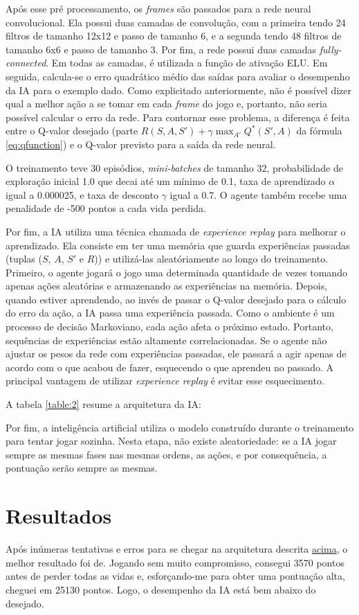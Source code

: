 Após esse pré processamento, os \textit{frames} são passados para a rede neural convolucional. Ela possui duas camadas de convolução, com a primeira tendo 24 filtros de tamanho 12x12 e passo de tamanho 6, e a segunda tendo 48 filtros de tamanho 6x6 e passo de tamanho 3.
Por fim, a rede possui duas camadas \textit{fully-connected}.
Em todas as camadas, é utilizada a função de ativação ELU.
Em seguida, calcula-se o erro quadrático médio das saídas para avaliar o desempenho da IA para o exemplo dado.
Como explicitado anteriormente, não é possível dizer qual a melhor ação a se tomar em cada \textit{frame} do jogo e, portanto, não seria possível calcular o erro da rede.
Para contornar esse problema, a diferença é feita entre o Q-valor desejado (parte $R(S,A,S') + \gamma\max_{A'}Q^{*}(S',A)$ da fórmula \ref{eq:qfunction}) e o Q-valor previsto para a saída da rede neural.

O treinamento teve 30 episódios, \textit{mini-batches} de tamanho 32, probabilidade de exploração inicial 1.0 que decai até um mínimo de 0.1, taxa de aprendizado $\alpha$ igual a 0.000025, e taxa de desconto $\gamma$ igual a 0.7. O agente também recebe uma penalidade de -500 pontos a cada vida perdida.

Por fim, a IA utiliza uma técnica chamada de \textit{experience replay} para melhorar o aprendizado. Ela consiste em ter uma memória que guarda experiências passadas (tuplas ($S$, $A$, $S'$ e $R$)) e utilizá-las aleatóriamente ao longo do treinamento.
Primeiro, o agente jogará o jogo uma determinada quantidade de vezes tomando apenas ações aleatórias e armazenando as experiências na memória.
Depois, quando estiver aprendendo, ao invés de passar o Q-valor desejado para o cálculo do erro da ação, a IA passa uma experiência passada.
Como o ambiente é um processo de decisão Markoviano, cada ação afeta o próximo estado. Portanto, sequências de experiências estão altamente correlacionadas. Se o agente não ajustar os pesos da rede com experiências passadas, ele passará a agir apenas de acordo com o que acabou de fazer, esquecendo o que aprendeu no passado.
A principal vantagem de utilizar \textit{experience replay} é evitar esse esquecimento.

A tabela \ref{table:2} resume a arquitetura da IA:

Por fim, a inteligência artificial utiliza o modelo construído durante o treinamento para tentar jogar sozinha. Nesta etapa, não existe aleatoriedade: se a IA jogar sempre as mesmas fases nas mesmas ordens, as ações, e por consequência, a pontuação serão sempre as mesmas.

\section{Resultados}
\label{sec:res}

Após inúmeras tentativas e erros para se chegar na arquitetura descrita \hyperref[table:2]{acima}, o melhor resultado foi de.
Jogando sem muito compromisso, consegui 3570 pontos antes de perder todas as vidas e, esforçando-me para obter uma pontuação alta, cheguei em 25130 pontos. Logo, o desempenho da IA está bem abaixo do desejado.
